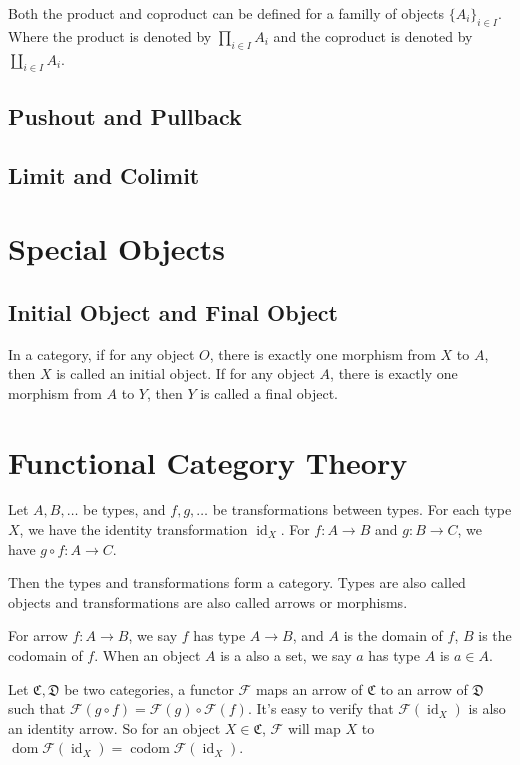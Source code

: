 \documentclass{article}
\newcommand{\id}{\mathop{\mathrm{id}}}
\newcommand{\dom}{\mathop{\mathrm{dom}}}
\newcommand{\codom}{\mathop{\mathrm{codom}}}
\begin{document}
Both the product and coproduct can be defined for a familly of objects $\{A_i\}_{i \in I}$.
Where the product is denoted by $\prod_{i \in I} A_i$ and the coproduct is denoted by $\coprod_{i \in I} A_i$.


\subsection{Pushout and Pullback}

\subsection{Limit and Colimit}

\section{Special Objects}
\subsection{Initial Object and Final Object}
In a category, if for any object $O$, there is exactly one
morphism from $X$ to $A$, then $X$ is called an initial object.
If for any object $A$, there is exactly one morphism from $A$ to $Y$,
then $Y$ is called a final object.


\section{Functional Category Theory}
Let $A, B, \dots$ be types, and $f, g, \dots$ be transformations between types.
For each type $X$, we have the identity transformation $\id_X$.
For $f : A \to B$ and $g : B \to C$, we have $g \circ f : A \to C$.

Then the types and transformations form a category.
Types are also called objects and transformations are also called arrows or morphisms.

For arrow $f : A \to B$, we say $f$ has type $A \to B$,
and $A$ is the domain of $f$, $B$ is the codomain of $f$.
When an object $A$ is a also a set, we say $a$ has type $A$ is $a \in A$.

Let $\mathfrak{C}, \mathfrak{D}$ be two categories, a functor $\mathcal{F}$
maps an arrow of $\mathfrak{C}$ to an arrow of $\mathfrak{D}$
such that $\mathcal{F}(g \circ f) = \mathcal{F}(g) \circ \mathcal{F}(f)$.
It's easy to verify that $\mathcal{F}(\id_X)$ is also an identity arrow.
So for an object $X \in \mathfrak{C}$, $\mathcal{F}$ will map $X$ to
$\dom \mathcal{F}(\id_X) = \codom \mathcal{F}(\id_X)$.
\end{document}
